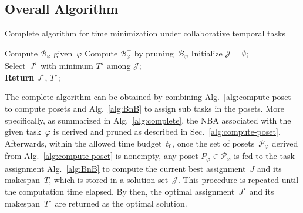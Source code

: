 \subsection{Overall Algorithm}\label{subsubsec:overall-algorithm}

\begin{algorithm}[t]
	\caption{Complete algorithm for time minimization
        under collaborative temporal tasks}
	\label{alg:complete}
	Compute $\mathcal{B}_{\varphi}$ given~$\varphi$ 
	Compute $\mathcal{B}^{-}_{\varphi}$ by pruning~$\mathcal{B}_{\varphi}$
        Initialize $\mathcal{J}=\emptyset$;\\
        Select~$J^\star$ with minimum $T^\star$ among $\mathcal{J}$;\\
	\textbf{Return} $J^\star$, $T^\star$;
\end{algorithm}

The complete algorithm can be obtained by combining
Alg.~\ref{alg:compute-poset} to compute posets
and Alg.~\ref{alg:BnB} to assign sub tasks in the posets.
More specifically, as summarized in Alg.~\ref{alg:complete},
the NBA associated with the given task~$\varphi$ is derived and pruned as
described in Sec.~\ref{alg:compute-poset}.
Afterwards, within the allowed time budget~$t_0$,
once the set of posets~$\mathcal{P}_{\varphi}$ derived from
Alg.~\ref{alg:compute-poset}
is nonempty, any poset $P_\varphi\in \mathcal{P}_{\varphi}$ is fed to
the task assignment Alg.~\ref{alg:BnB} to compute the current best
assignment~$J$ and its makespan~$T$, which is stored in
a solution set~$\mathcal{J}$.
This procedure is repeated until the computation time elapsed.
By then, the optimal assignment~$J^\star$ and its makespan~$T^\star$
are returned as the optimal solution.

